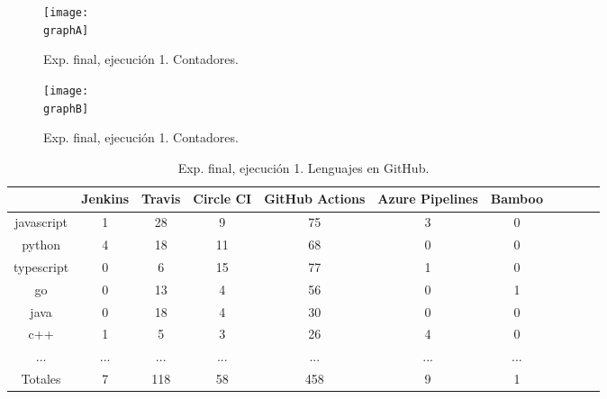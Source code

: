 \begin{figure}
  \centering
  \texttt{[image: \\graphA]}
  \caption{Exp. final, ejecución 1. Contadores.}
\end{figure}

\begin{figure}
  \centering
  \texttt{[image: \\graphB]}
  \caption{Exp. final, ejecución 1. Contadores.}
\end{figure}

\begin{table}
  \centering
  \caption{Exp. final, ejecución 1. Lenguajes en GitHub.}
  \label{tab:tabla_f1_2a}

\begin{footnotesize}
\renewcommand{\arraystretch}{1.5} %
\begin{tabular}{ccccccccccc}
  \hline
  {} &  Jenkins &  Travis &  Circle CI &  GitHub Actions &  Azure Pipelines &  Bamboo \\
  \hline
  javascript       &        1 &      28 &          9 &              75 &                3 &       0 \\
  python           &        4 &      18 &         11 &              68 &                0 &       0 \\
  typescript       &        0 &       6 &         15 &              77 &                1 &       0 \\
  go               &        0 &      13 &          4 &              56 &                0 &       1 \\
  java             &        0 &      18 &          4 &              30 &                0 &       0 \\
  c++              &        1 &       5 &          3 &              26 &                4 &       0 \\
  ...              &      ... &     ... &        ... &             ... &              ... &     ... \\
  \hline
  Totales          &        7 &     118 &         58 &             458 &                9 &       1 \\
 \end{tabular}
\end{footnotesize}

\end{table}

